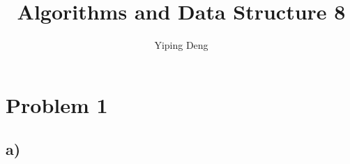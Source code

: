 \documentclass{article}
\newcommand{\hwnumber}{8}
\begin{document}
\title{Algorithms and Data Structure \hwnumber}
\author{Yiping Deng}
\maketitle
\thispagestyle{fancy}
\section*{Problem 1}
\subsection*{a)}
\end{document}
